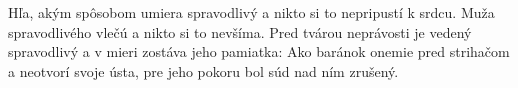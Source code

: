 Hľa, akým spôsobom umiera spravodlivý
a nikto si to nepripustí k srdcu.
Muža spravodlivého vlečú
a nikto si to nevšíma.
Pred tvárou neprávosti
je vedený spravodlivý
\versseparator
a v mieri zostáva jeho pamiatka:
\versseparator
Ako baránok onemie pred strihačom a neotvorí svoje ústa, pre jeho pokoru bol súd nad ním zrušený.